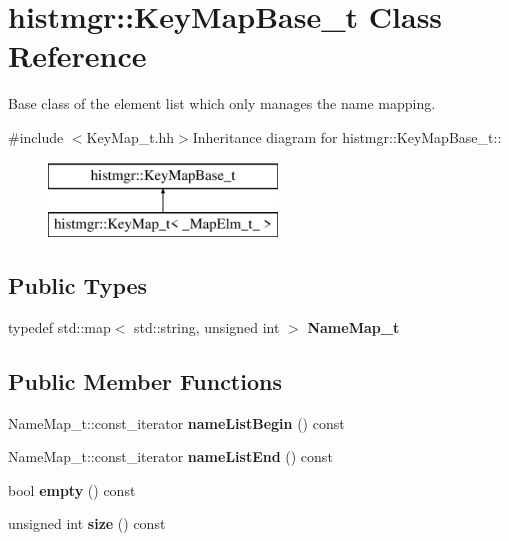 \section{histmgr::KeyMapBase\_\-t Class Reference}
\label{classhistmgr_1_1KeyMapBase__t}


Base class of the element list which only manages the name mapping.  


{\ttfamily \#include $<$KeyMap\_\-t.hh$>$}Inheritance diagram for histmgr::KeyMapBase\_\-t::\begin{figure}[H]
\begin{center}
\leavevmode
\includegraphics[height=2cm]{classhistmgr_1_1KeyMapBase__t}
\end{center}
\end{figure}
\subsection*{Public Types}
\begin{DoxyCompactItemize}
\item 
typedef std::map$<$ std::string, unsigned int $>$ {\bfseries NameMap\_\-t}\label{classhistmgr_1_1KeyMapBase__t_ae49c6a47e8e2391af4a57a3dc1f40020}

\end{DoxyCompactItemize}
\subsection*{Public Member Functions}
\begin{DoxyCompactItemize}
\item 
NameMap\_\-t::const\_\-iterator {\bfseries nameListBegin} () const \label{classhistmgr_1_1KeyMapBase__t_af1bc65af4564e7cd74c6ab25b35ca9e5}

\item 
NameMap\_\-t::const\_\-iterator {\bfseries nameListEnd} () const \label{classhistmgr_1_1KeyMapBase__t_aac7ea5403cabbabff2a01dc108072f1f}

\item 
bool {\bfseries empty} () const \label{classhistmgr_1_1KeyMapBase__t_a63938a3f927f441c92a91467eee12fa4}

\item 
unsigned int {\bfseries size} () const \label{classhistmgr_1_1KeyMapBase__t_abe4ee7508376462845afcfe84ce92672}

\end{DoxyCompactItemize}
